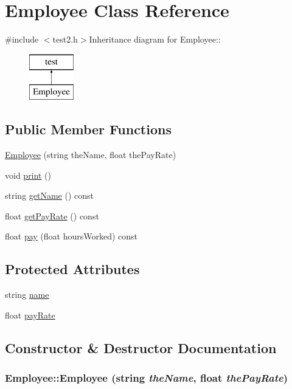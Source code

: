 \hypertarget{class_employee}{
\section{Employee Class Reference}
\label{class_employee}
}


{\ttfamily \#include $<$test2.h$>$}Inheritance diagram for Employee::\begin{figure}[H]
\begin{center}
\leavevmode
\includegraphics[height=2cm]{class_employee}
\end{center}
\end{figure}
\subsection*{Public Member Functions}
\begin{DoxyCompactItemize}
\item 
\hyperlink{class_employee_add6408eefbb46cd8dd033187a666bc24}{Employee} (string theName, float thePayRate)
\item 
void \hyperlink{class_employee_a79556ad700627dba88049f487a34a762}{print} ()
\item 
string \hyperlink{class_employee_ab21f76396041c5ea51b5359aa76361e3}{getName} () const 
\item 
float \hyperlink{class_employee_a05cf3feeb14354a9966420ad191e53b1}{getPayRate} () const 
\item 
float \hyperlink{class_employee_a99c934c41b73b1bd595687d619a8e7e7}{pay} (float hoursWorked) const 
\end{DoxyCompactItemize}
\subsection*{Protected Attributes}
\begin{DoxyCompactItemize}
\item 
string \hyperlink{class_employee_a1934a85a4a9a8fd00ae04425c5cc4f67}{name}
\item 
float \hyperlink{class_employee_a5d97c95da8ec82d1b6f66de6e6879806}{payRate}
\end{DoxyCompactItemize}


\subsection{Constructor \& Destructor Documentation}
\hypertarget{class_employee_add6408eefbb46cd8dd033187a666bc24}{
\subsubsection[{Employee}]{\setlength{\rightskip}{0pt plus 5cm}Employee::Employee (string {\em theName}, \/  float {\em thePayRate})}}
\label{class_employee_add6408eefbb46cd8dd033187a666bc24}


